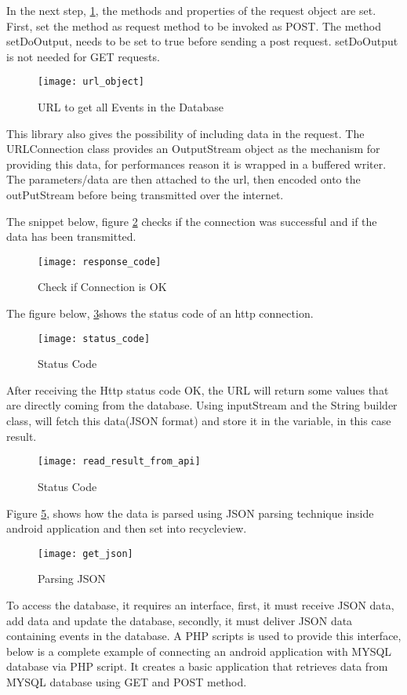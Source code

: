 In the next step, \ref{fig:url_get}, the methods and properties of the request object are set. First, set the method as request method to be invoked as POST. The method setDoOutput, needs to be set to true before sending a post request. setDoOutput is not needed for GET requests.
  \begin{figure}[h!]
 	\centering       
 	\texttt{[image: url\_object]}
 	\caption{URL to get all Events in the Database}
 	\label{fig:url_get}	
 \end{figure} 

 This library also gives the possibility of including data in the request. The URLConnection class provides an OutputStream object as the mechanism for providing this data, for performances reason it is wrapped in a buffered writer.
 The parameters/data are then attached to the url, then encoded onto the outPutStream before being transmitted over the internet.

The snippet below, figure \ref{fig:response_code} checks if the connection was successful and if the data has been transmitted.
\begin{figure}[h!]
	\centering       
	\texttt{[image: response\_code]}
	\caption{Check if Connection is OK}
	\label{fig:response_code}	
\end{figure}

 The figure below, \ref{fig:status_code}shows the status code of an http connection.
\begin{figure}[h!]
	\centering       
	\texttt{[image: status\_code]}
	\caption{Status Code}
	\label{fig:status_code}	
\end{figure} 

 After receiving the Http status code OK, the URL will return some values that are directly coming from the database. Using inputStream and the String builder class, will fetch this data(JSON format) and store it in the variable, in this case result.
\begin{figure}[h!]
	\centering       
	\texttt{[image: read\_result\_from\_api]}
	\caption{Status Code}
	\label{fig:read_result}	
\end{figure}

Figure \ref{fig:parse_json}, shows how the data is parsed using JSON parsing technique inside android application and then set into recycleview. 
\begin{figure}[h!]
	\centering       
	\texttt{[image: get\_json]}
	\caption{Parsing JSON}
	\label{fig:parse_json}	
\end{figure}
\pagebreak
To access the database, it requires an interface, first, it must receive JSON data, add data and update the database, secondly, it
must deliver JSON data containing events in the database.
A PHP scripts is used to provide this interface, below is a complete example of connecting an android application with MYSQL database via PHP script. It creates a basic application that retrieves data from MYSQL database using GET and POST method.

